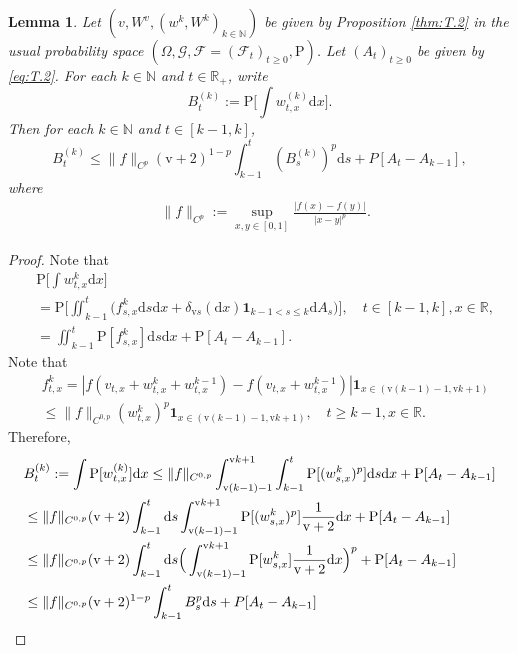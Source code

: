 \documentclass[12pt,a4paper]{amsart}
\numberwithin{equation}{section}
\theoremstyle{plain}
\newtheorem{lemma}[theorem]{Lemma}
\theoremstyle{remark}
\begin{document}
\begin{lemma} \label{thm:T.732}
	Let $(v, W^v, (w^k, W^k)_{k\in \mathbb N})$ be given by Proposition \ref{thm:T.2} in the usual probability space $(\Omega, \mathcal G, \mathcal F = (\mathcal F_t)_{t\geq 0}, \mathrm P)$. 
	Let $(A_t)_{t\geq 0}$ be given by \eqref{eq:T.2}.
	For each $k\in \mathbb N$ and $t\in \mathbb R_+$, write \[B_t^{(k)} := \mathrm P\Big[\int w_{t,x}^{(k)}\mathrm dx\Big].\]  
	Then for each $k\in \mathbb N$ and $t\in [k-1,k]$,
\[
	B_t^{(k)} \leq \|f\|_{C^{p}}(\mathrm v+2)^{1-p} \int_{k-1}^t  (B_s^{(k)})^p \mathrm ds + P[A_t - A_{k-1}],
\]
	where
\begin{align} 
& \|f\|_{C^p}:=  \sup_{x,y\in [0,1]} \frac{|f(x)- f(y)|}{|x-y|^p}.
\end{align}
\end{lemma}
\begin{proof}
	Note that 
\begin{align} 
		&\mathrm P\Big[\int w^k_{t,x} \mathrm dx\Big] 
		\\&=\mathrm P \Big[\iint_{k-1}^t \big(f^k_{s,x}\mathrm ds\mathrm dx + \delta_{\mathrm vs}(\mathrm dx) \mathbf 1_{k-1<s\leq k} \mathrm d A_s\big)\Big], \quad t\in [k-1,k], x\in \mathbb R,
		\\ &=  \iint_{k-1}^t \mathrm P[f^k_{s,x}]\mathrm ds\mathrm dx + \mathrm P[A_{t} - A_{k-1}].
\end{align}
	Note that 
\begin{align} 
	& f^k_{t,x} 
	=  |f(v_{t,x}+ w_{t,x}^{k} + w_{t,x}^{k-1}) - f(v_{t,x}+ w_{t,x}^{k-1})| \mathbf 1_{x\in (\mathrm v(k-1) - 1, \mathrm vk  + 1)} 
	\\&\leq \|f\|_{C^{0,p}}(w_{t,x}^k)^p\mathbf 1_{x\in (\mathrm v(k-1) - 1, \mathrm vk  + 1)}, \quad t\geq k-1, x\in \mathbb R.
\end{align}
	Therefore, 
\begin{align}
	&B_t^{(k)}:=\int \mathrm P[w^{(k)}_{t,x}] \mathrm dx 
	\leq \|f\|_{C^{0,p}}\int_{\mathrm v(k-1) - 1}^{\mathrm vk  + 1} \int_{k-1}^t \mathrm P[(w_{s,x}^k)^p]\mathrm ds\mathrm dx + \mathrm P[A_{t} - A_{k-1}]
	\\& \leq \|f\|_{C^{0,p}}(\mathrm v +2)\int_{k-1}^t \mathrm ds \int_{\mathrm v(k-1) - 1}^{\mathrm vk  + 1}  \mathrm P[(w_{s,x}^k)^p]\frac{1}{\mathrm v+2}\mathrm dx + \mathrm P[A_{t} - A_{k-1}]
	\\&\leq \|f\|_{C^{0,p}}(\mathrm v +2)\int_{k-1}^t \mathrm ds \Big(\int_{\mathrm v(k-1) - 1}^{\mathrm vk  + 1} \mathrm P[w_{s,x}^k]\frac{1}{\mathrm v+2} \mathrm dx\Big)^p + \mathrm P[A_{t} - A_{k-1}]
	\\&\leq \|f\|_{C^{0,p}}(\mathrm v+2)^{1-p} \int_{k-1}^t  B_s^p \mathrm ds + P[A_t - A_{k-1}]
	\qedhere
\end{align}
\end{proof}
\end{document}
